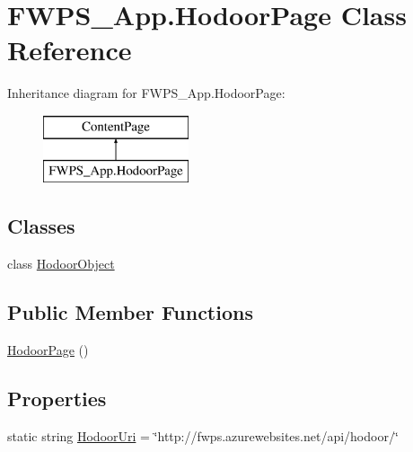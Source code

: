\hypertarget{class_f_w_p_s___app_1_1_hodoor_page}{}\section{F\+W\+P\+S\+\_\+\+App.\+Hodoor\+Page Class Reference}
\label{class_f_w_p_s___app_1_1_hodoor_page}
Inheritance diagram for F\+W\+P\+S\+\_\+\+App.\+Hodoor\+Page\+:\begin{figure}[H]
\begin{center}
\leavevmode
\includegraphics[height=2.000000cm]{class_f_w_p_s___app_1_1_hodoor_page}
\end{center}
\end{figure}
\subsection*{Classes}
\begin{DoxyCompactItemize}
\item 
class \mbox{\hyperlink{class_f_w_p_s___app_1_1_hodoor_page_1_1_hodoor_object}{Hodoor\+Object}}
\end{DoxyCompactItemize}
\subsection*{Public Member Functions}
\begin{DoxyCompactItemize}
\item 
\mbox{\hyperlink{class_f_w_p_s___app_1_1_hodoor_page_a51754d10d86aec441ab5791ccda07016}{Hodoor\+Page}} ()
\end{DoxyCompactItemize}
\subsection*{Properties}
\begin{DoxyCompactItemize}
\item 
static string \mbox{\hyperlink{class_f_w_p_s___app_1_1_hodoor_page_a27c80c2b164fe0765232020a13c52555}{Hodoor\+Uri}} = \char`\"{}http\+://fwps.\+azurewebsites.\+net/api/hodoor/\char`\"{}
\end{DoxyCompactItemize}
